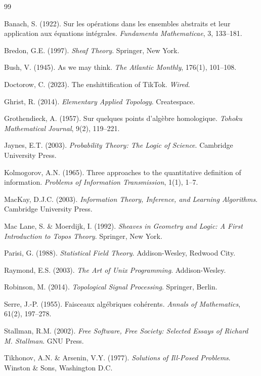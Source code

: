 \documentclass[12pt, oneside]{article}
\begin{document}
\newpage
\begin{thebibliography}{99}

Banach, S. (1922). Sur les op\'erations dans les ensembles abstraits et leur application aux \'equations int\'egrales. \textit{Fundamenta Mathematicae}, 3, 133--181.

Bredon, G.E. (1997). \textit{Sheaf Theory}. Springer, New York.

Bush, V. (1945). As we may think. \textit{The Atlantic Monthly}, 176(1), 101--108.

Doctorow, C. (2023). The enshittification of TikTok. \textit{Wired}.

Ghrist, R. (2014). \textit{Elementary Applied Topology}. Createspace.

Grothendieck, A. (1957). Sur quelques points d'alg\`ebre homologique. \textit{Tohoku Mathematical Journal}, 9(2), 119--221.

Jaynes, E.T. (2003). \textit{Probability Theory: The Logic of Science}. Cambridge University Press.

Kolmogorov, A.N. (1965). Three approaches to the quantitative definition of information. \textit{Problems of Information Transmission}, 1(1), 1--7.

MacKay, D.J.C. (2003). \textit{Information Theory, Inference, and Learning Algorithms}. Cambridge University Press.

Mac Lane, S. \& Moerdijk, I. (1992). \textit{Sheaves in Geometry and Logic: A First Introduction to Topos Theory}. Springer, New York.

Parisi, G. (1988). \textit{Statistical Field Theory}. Addison-Wesley, Redwood City.

Raymond, E.S. (2003). \textit{The Art of Unix Programming}. Addison-Wesley.

Robinson, M. (2014). \textit{Topological Signal Processing}. Springer, Berlin.

Serre, J.-P. (1955). Faisceaux alg\'ebriques coh\'erents. \textit{Annals of Mathematics}, 61(2), 197--278.

Stallman, R.M. (2002). \textit{Free Software, Free Society: Selected Essays of Richard M. Stallman}. GNU Press.

Tikhonov, A.N. \& Arsenin, V.Y. (1977). \textit{Solutions of Ill-Posed Problems}. Winston \& Sons, Washington D.C.


\end{thebibliography}
\end{document}
